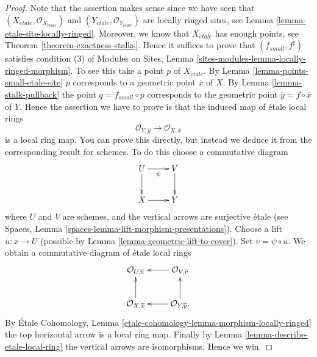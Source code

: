 \documentclass[10pt,a4paper]{amsart}
\theoremstyle{plain}
\theoremstyle{definition}
\theoremstyle{remark}
\numberwithin{equation}{subsection}
\def\etale{{\acute{e}tale}}
\begin{document}
\begin{proof}
Note that the assertion makes sense since we have seen that
$(X_\etale, \mathcal{O}_{X_\etale})$ and
$(Y_\etale, \mathcal{O}_{Y_\etale})$
are locally ringed sites, see
Lemma \ref{lemma-etale-site-locally-ringed}.
Moreover, we know that $X_\etale$ has enough points, see
Theorem \ref{theorem-exactness-stalks}.
Hence it suffices to prove that $(f_{small}, f^\sharp)$
satisfies condition (3) of
Modules on Sites,
Lemma \ref{sites-modules-lemma-locally-ringed-morphism}.
To see this take a point $p$ of $X_\etale$. By
Lemma \ref{lemma-points-small-etale-site}
$p$ corresponds to a geometric point $\overline{x}$ of $X$.
By
Lemma \ref{lemma-stalk-pullback}
the point $q = f_{small} \circ p$ corresponds to the
geometric point $\overline{y} = f \circ \overline{x}$ of $Y$.
Hence the assertion we have to prove is that the induced map
of \'etale local rings
$$
\mathcal{O}_{Y, \overline{y}} \longrightarrow \mathcal{O}_{X, \overline{x}}
$$
is a local ring map. You can prove this directly, but instead we deduce it
from the corresponding result for schemes. To do this choose a commutative
diagram
$$
\xymatrix{
U \ar[d] \ar[r]_\psi & V \ar[d] \\
X \ar[r] & Y
}
$$
where $U$ and $V$ are schemes, and the vertical arrows are surjective
\'etale (see
Spaces, Lemma \ref{spaces-lemma-lift-morphism-presentations}).
Choose a lift $\overline{u} : \overline{x} \to U$ (possible by
Lemma \ref{lemma-geometric-lift-to-cover}).
Set $\overline{v} = \psi \circ \overline{u}$. We obtain a commutative
diagram of \'etale local rings
$$
\xymatrix{
\mathcal{O}_{U, \overline{u}} &
\mathcal{O}_{V, \overline{v}} \ar[l] \\
\mathcal{O}_{X, \overline{x}} \ar[u] &
\mathcal{O}_{Y, \overline{y}}. \ar[l] \ar[u]
}
$$
By
\'Etale Cohomology, Lemma \ref{etale-cohomology-lemma-morphism-locally-ringed}
the top horizontal arrow is a local ring map. Finally by
Lemma \ref{lemma-describe-etale-local-ring}
the vertical arrows are isomorphisms. Hence we win.
\end{proof}
\end{document}
